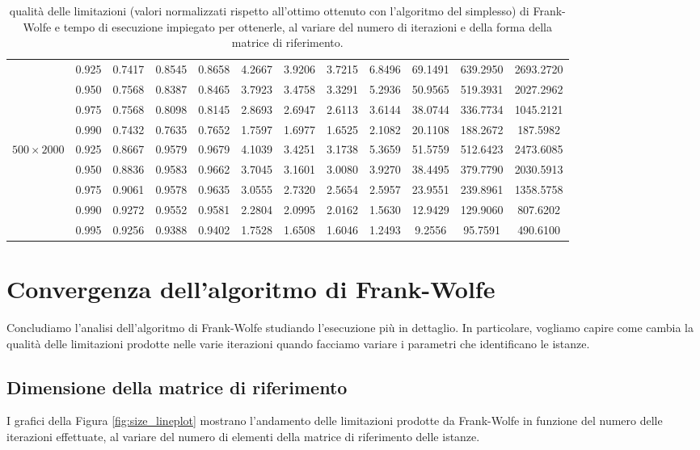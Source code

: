 \begin{landscape}
\begin{table}[!h]
\begin{tabularx}{659.32144pt}{cccccccccccc}
        & 0.925 & 0.7417 & 0.8545 & 0.8658 & 4.2667 & 3.9206 & 3.7215 & 6.8496 & 69.1491 & 639.2950 & 2693.2720 \\
        & 0.950 & 0.7568 & 0.8387 & 0.8465 & 3.7923 & 3.4758 & 3.3291 & 5.2936 & 50.9565 & 519.3931 & 2027.2962 \\
        & 0.975 & 0.7568 & 0.8098 & 0.8145 & 2.8693 & 2.6947 & 2.6113 & 3.6144 & 38.0744 & 336.7734 & 1045.2121 \\
        & 0.990 & 0.7432 & 0.7635 & 0.7652 & 1.7597 & 1.6977 & 1.6525 & 2.1082 & 20.1108 & 188.2672 & 187.5982 \\
        \midrule
        \( 500\times 2000 \)
        & 0.925 & 0.8667 & 0.9579 & 0.9679 & 4.1039 & 3.4251 & 3.1738 & 5.3659 & 51.5759 & 512.6423 & 2473.6085 \\
        & 0.950 & 0.8836 & 0.9583 & 0.9662 & 3.7045 & 3.1601 & 3.0080 & 3.9270 & 38.4495 & 379.7790 & 2030.5913 \\
        & 0.975 & 0.9061 & 0.9578 & 0.9635 & 3.0555 & 2.7320 & 2.5654 & 2.5957 & 23.9551 & 239.8961 & 1358.5758 \\
        & 0.990 & 0.9272 & 0.9552 & 0.9581 & 2.2804 & 2.0995 & 2.0162 & 1.5630 & 12.9429 & 129.9060 & 807.6202 \\
        & 0.995 & 0.9256 & 0.9388 & 0.9402 & 1.7528 & 1.6508 & 1.6046 & 1.2493 & 9.2556 & 95.7591 & 490.6100 \\
        \bottomrule
    \end{tabularx}
    \caption{qualità delle limitazioni (valori normalizzati rispetto all'ottimo ottenuto con l'algoritmo del simplesso)
    di Frank-Wolfe e tempo di esecuzione impiegato per ottenerle, al variare del numero di iterazioni e della forma
    della matrice di riferimento.}
    \label{table:hugetable4}
\end{table}
\end{landscape}

\section{Convergenza dell'algoritmo di Frank-Wolfe}
Concludiamo l'analisi dell'algoritmo di Frank-Wolfe studiando l'esecuzione più in dettaglio. In particolare, vogliamo
capire come cambia la qualità delle limitazioni prodotte nelle varie iterazioni quando facciamo variare i parametri che
identificano le istanze.

\subsection{Dimensione della matrice di riferimento}
I grafici della Figura \ref{fig:size_lineplot} mostrano l'andamento delle limitazioni prodotte da Frank-Wolfe in
funzione del numero delle iterazioni effettuate, al variare del numero di elementi della matrice di riferimento delle
istanze.

